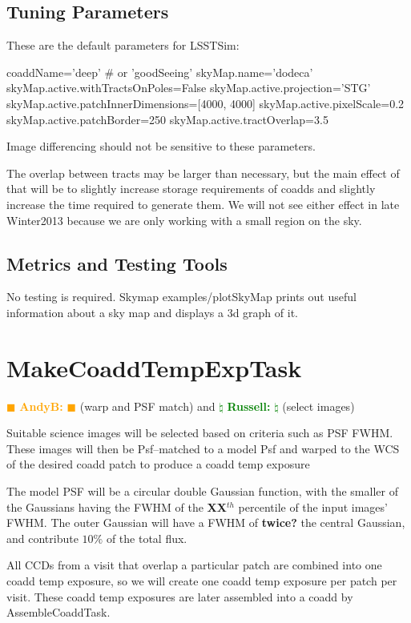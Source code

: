 \documentclass[12pt]{article}
\newcommand{\becker} { \textcolor{orange} {
\ensuremath{\blacksquare} {\bf AndyB:}  
\ensuremath{\blacksquare} } }
\newcommand{\russ} { \textcolor{green} {
\ensuremath{\natural} {\bf Russell:}  
\ensuremath{\natural} } }
\begin{document}
\subsection{Tuning Parameters}

These are the default parameters for LSSTSim:

\begin{python}
coaddName='deep' # or 'goodSeeing'
skyMap.name='dodeca'
skyMap.active.withTractsOnPoles=False
skyMap.active.projection='STG'
skyMap.active.patchInnerDimensions=[4000, 4000]
skyMap.active.pixelScale=0.2
skyMap.active.patchBorder=250
skyMap.active.tractOverlap=3.5
\end{python}

Image differencing should not be sensitive to these parameters.

The overlap between tracts may be larger than necessary, but the main effect of that
will be to slightly increase storage requirements of coadds and slightly increase
the time required to generate them. We will not see either effect in late Winter2013
because we are only working with a small region on the sky.

\subsection{Metrics and Testing Tools}

No testing is required.  Skymap examples/plotSkyMap prints out useful
information about a sky map and displays a 3d graph of it.


\clearpage 
\section{MakeCoaddTempExpTask} \becker (warp and PSF match) and \russ (select images)

Suitable science images will be selected based on criteria such as PSF FWHM.
These images will then be Psf--matched to a model Psf and warped
to the WCS of the desired coadd patch to produce a coadd temp exposure

The model PSF will be a circular double Gaussian
function, with the smaller of the Gaussians having the FWHM of the
{\bf XX}$^{th}$ percentile of the input images' FWHM.  The outer
Gaussian will have a FWHM of {\bf twice?} the central Gaussian, and
contribute {\bf $10\%$} of the total flux.

All CCDs from a visit that overlap a particular patch are combined into one coadd temp exposure,
so we will create one coadd temp exposure per patch per visit.
These coadd temp exposures are later assembled into a coadd by AssembleCoaddTask.
\end{document}
